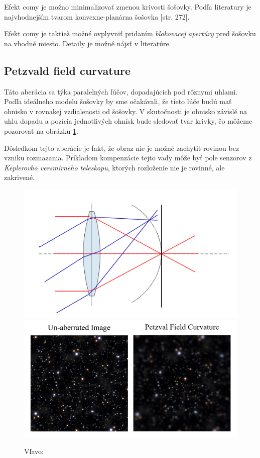 Efekt comy je možno minimalizovať zmenou krivosti šošovky. Podľa literatury je najvhodnejším tvarom 
konvexne-planárna šošovka \cite{hechtoptics}[str. 272].

Efekt comy je taktiež možné ovplyvniť pridaním \textit{blokovacej apertúry} pred šošovku na vhodné miesto.
Detaily je možné nájsť v literatúre\cite{hechtoptics}.


\subsection{Petzvald field curvature}
Táto aberácia sa týka paralelných ľúčov, dopadajúcich pod rôznymi uhlami. Podľa ideálneho modelu
šošovky by sme očakávali, že tieto ľúče budú mať ohnisko v rovnakej vzdialenosti od šošovky. 
V skutočnosti je ohnisko závislé na uhlu dopadu a pozícia jednotlivých ohnísk bude sledovať tvar
krivky, čo môžeme pozorovať na obrázku \ref{comaDescribe}.

Dôsledkom tejto aberácie je fakt, že obraz nie je možné zachytiť rovinou bez vzniku rozmazania. 
Príkladom kompenzácie tejto vady môže byť pole senzorov z \textit{Keplerovho versmírneho teleskopu},
ktorých rozloženie nie je rovinné, ale zakrivené.

\begin{figure}[h]
    \label{comaDescribe}
\includegraphics[scale=0.15]{obrazky-figures/fieldcurvature.png}
\includegraphics[scale=0.60]{obrazky-figures/fieldAberration.png}
    \centering \caption{Vľavo: }
\end{figure}



